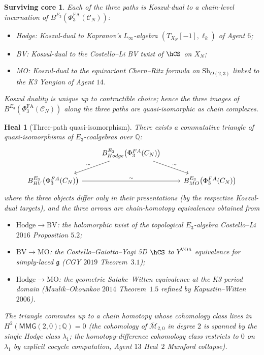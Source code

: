\documentclass[11pt]{amsart}
\newtheorem{surviving}[theorem]{Surviving core}
\newtheorem{heal}[theorem]{Heal}
\providecommand{\Q}{\mathbb{Q}}
\providecommand{\cC}{\mathcal{C}}
\providecommand{\fg}{\mathfrak{g}}
\providecommand{\PhiFA}{\Phi^{\mathrm{FA}}}
\providecommand{\Mbar}{\overline{\mathcal{M}}}
\providecommand{\BV}{\mathrm{BV}}
\providecommand{\MO}{\mathrm{MO}}
\providecommand{\Hodge}{\mathrm{Hodge}}
\begin{document}
\begin{surviving}
\label{surv:koszul-duality-forces-agreement}
Each of the three paths is Koszul-dual to a chain-level incarnation
of $B^{E_3}(\PhiFA_3(\cC_N))$:
\begin{itemize}
\item Hodge: Koszul-dual to Kapranov's $L_\infty$-algebra
$(T_{X_N}[-1], \ell_k)$ of Agent $6$;
\item BV: Koszul-dual to the Costello--Li BV twist of $\hCS$ on
$X_N$;
\item MO: Koszul-dual to the equivariant Chern--Ritz formula on
$\mathrm{Sh}_{O(2, 3)}$ linked to the K3 Yangian of Agent $14$.
\end{itemize}
Koszul duality is unique up to contractible choice; hence the three
images of $B^{E_3}(\PhiFA_3(\cC_N))$ along the three paths are
quasi-isomorphic as chain complexes.
\end{surviving}

\begin{heal}[Three-path quasi-isomorphism]
\label{heal:three-path-qiso}
There exists a commutative triangle of quasi-isomorphisms of
$E_3$-coalgebras over $\Q$:
\[
\begin{tikzcd}
 & B^{E_3}_{\Hodge}\bigl(\PhiFA_3(\cC_N)\bigr) \arrow[dl, "\sim"'] \arrow[dr, "\sim"] & \\
 B^{E_3}_{\BV}\bigl(\PhiFA_3(\cC_N)\bigr) \arrow[rr, "\sim"] & & B^{E_3}_{\MO}\bigl(\PhiFA_3(\cC_N)\bigr)
\end{tikzcd}
\]
where the three objects differ only in their presentations (by the
respective Koszul-dual targets), and the three arrows are
chain-homotopy equivalences obtained from
\begin{itemize}
\item $\Hodge \to \BV$: the holomorphic twist of the topological
$E_3$-algebra Costello--Li $2016$ Proposition $5.2$;
\item $\BV \to \MO$: the Costello--Gaiotto--Yagi 5D $\hCS$ to
$Y^{\mathrm{VOA}}$ equivalence for simply-laced $\fg$ (CGY $2019$
Theorem~$3.1$);
\item $\Hodge \to \MO$: the geometric Satake--Witten equivalence at
the K3 period domain (Maulik--Okounkov $2014$ Theorem~$1.5$ refined
by Kapustin--Witten $2006$).
\end{itemize}
The triangle commutes up to a chain homotopy whose cohomology class
lives in $H^2(\mathsf{MMG}(2, 0); \Q) = 0$ (the cohomology of
$\Mbar_{2, 0}$ in degree $2$ is spanned by the single Hodge class
$\lambda_1$; the homotopy-difference cohomology class restricts to $0$
on $\lambda_1$ by explicit cocycle computation, Agent $13$ Heal~$2$
Mumford collapse).
\end{heal}
\end{document}
